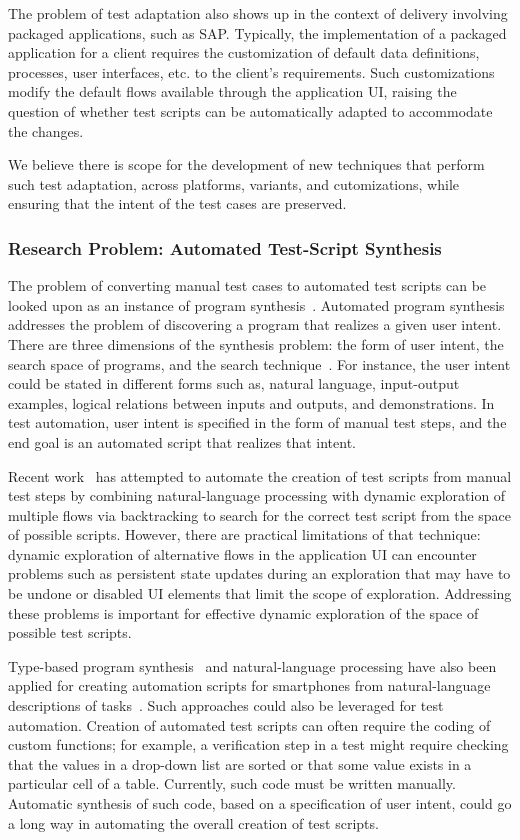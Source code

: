The problem of test adaptation also shows up in the context of delivery
involving packaged applications, such as SAP. Typically, the implementation of a
packaged application for a client requires the customization of default data
definitions, processes, user interfaces, etc. to the client's requirements. Such
customizations modify the default flows available through the application UI,
raising the question of whether test scripts can be automatically adapted to
accommodate the changes.

We believe there is scope for the development of new techniques that perform
such test adaptation, across platforms, variants, and cutomizations, while
ensuring that the intent of the test cases are preserved.

\subsubsection*{Research Problem: Automated Test-Script Synthesis}

The problem of converting manual test cases to automated test scripts can be
looked upon as an instance of program synthesis~\cite{Gulwani:2010}.  Automated
program synthesis addresses the problem of discovering a program that realizes a
given user intent. There are three dimensions of the synthesis problem: the form
of user intent, the search space of programs, and the search
technique~\cite{Gulwani:2010}. For instance, the user intent could be stated in
different forms such as, natural language, input-output examples, logical
relations between inputs and outputs, and demonstrations. In test automation,
user intent is specified in the form of manual test steps, and the end goal is
an automated script that realizes that intent.

Recent work~\cite{thummalapenta:2012a} has attempted to automate the creation of
test scripts from manual test steps by combining natural-language processing
with dynamic exploration of multiple flows via backtracking to search for the
correct test script from the space of possible scripts. However, there are
practical limitations of that technique: dynamic exploration of alternative
flows in the application UI can encounter problems such as persistent state
updates during an exploration that may have to be undone or disabled UI elements
that limit the scope of exploration. Addressing these problems is important for
effective dynamic exploration of the space of possible test scripts.

Type-based program synthesis~\cite{Perelman:2012} and natural-language
processing have also been applied for creating automation scripts for
smartphones from natural-language descriptions of tasks~\cite{Le:2013}. Such
approaches could also be leveraged for test automation. Creation of automated
test scripts can often require the coding of custom functions; for example, a
verification step in a test might require checking that the values in a
drop-down list are sorted or that some value exists in a particular cell of a
table. Currently, such code must be written manually. Automatic synthesis of
such code, based on a specification of user intent, could go a long way in
automating the overall creation of test scripts.

